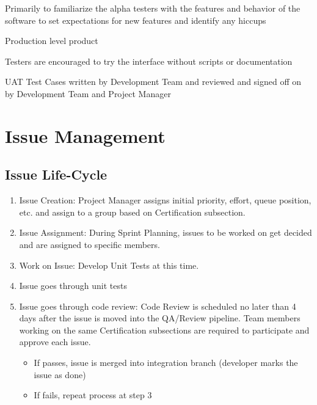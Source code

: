 \documentclass[letterpaper,10pt,english,openany,oneside]{sphinxmanual}
\let\sphinxpxdimen\pdfpxdimen\else\newdimen\sphinxpxdimen
\begin{document}
 Primarily to familiarize the alpha testers with the features and behavior of the software to set expectations for new features and identify any hiccups

 Production level product

 Testers are encouraged to try the interface without scripts or documentation

 UAT Test Cases written by Development Team and reviewed and signed off on by Development Team and Project Manager


\chapter{Issue Management}
\label{\detokenize{test_plan/issue_management:issue-management}}\label{\detokenize{test_plan/issue_management:id1}}\label{\detokenize{test_plan/issue_management::doc}}
\noindent\sphinxincludegraphics[width=600\sphinxpxdimen]{{issue_lifecycle}.png}


\section{Issue Life-Cycle}
\label{\detokenize{test_plan/issue_management:issue-life-cycle}}\begin{enumerate}
%
\item {} 
Issue Creation: Project Manager assigns initial priority, effort, queue position, etc. and assign to a group based on Certification subsection.

\item {} 
Issue Assignment: During Sprint Planning, issues to be worked on get decided and are assigned to specific members.

\item {} 
Work on Issue: Develop Unit Tests at this time.

\item {} 
Issue goes through unit tests

\item {} 
Issue goes through code review: Code Review is scheduled no later than 4 days after the issue is moved into the QA/Review pipeline. Team members working on the same Certification subsections are required to participate and approve each issue.
\begin{itemize}
\item {} 
If passes, issue is merged into integration branch (developer marks the issue as done)

\item {} 
If fails, repeat process at step 3

\end{itemize}

\end{enumerate}
\end{document}
